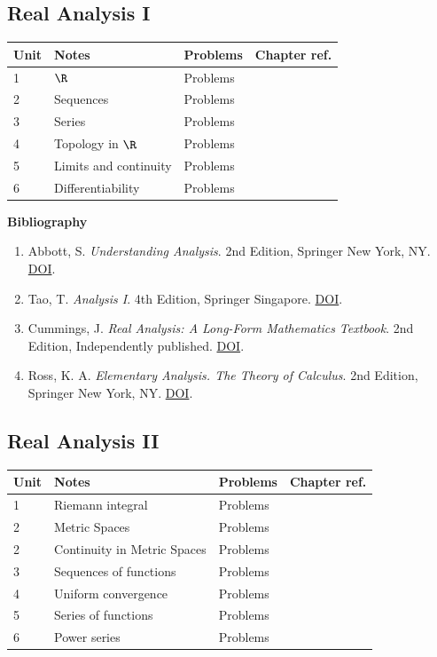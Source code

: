 \subsection*{Real Analysis I}

\begin{tabular}{llll}
  \hline
  Unit & Notes & Problems & Chapter ref. \\
  \hline
  1 & $\R$ & Problems & \\
  2 & Sequences & Problems & \\
  3 & Series & Problems & \\
  4 & Topology in $\R$ & Problems & \\
  5 & Limits and continuity & Problems & \\
  6 & Differentiability & Problems & \\
  \hline
\end{tabular}

\textbf{Bibliography}

\begin{enumerate}
  \item Abbott, S. \emph{Understanding Analysis}. 2nd Edition, Springer New York, NY. \href{https://doi.org/10.1007/978-1-4939-2712-8}{DOI}.
  \item Tao, T. \emph{Analysis I}. 4th Edition, Springer Singapore. \href{https://doi.org/10.1007/978-981-19-7261-4}{DOI}.
  \item Cummings, J. \emph{Real Analysis: A Long-Form Mathematics Textbook}. 2nd Edition, Independently published. \href{https://longformmath.com/real-analysis-book}{DOI}.
  \item Ross, K. A. \emph{Elementary Analysis. The Theory of Calculus}. 2nd Edition, Springer New York, NY. \href{https://doi.org/10.1007/978-1-4614-6271-2}{DOI}.
\end{enumerate}

\subsection*{Real Analysis II}

\begin{tabular}{llll}
  \hline
  Unit & Notes & Problems & Chapter ref. \\
  \hline
  1 & Riemann integral & Problems & \\
  2 & Metric Spaces & Problems & \\
  2 & Continuity in Metric Spaces & Problems & \\
  3 & Sequences of functions & Problems & \\
  4 & Uniform convergence & Problems & \\
  5 & Series of functions & Problems & \\
  6 & Power series & Problems & \\
  \hline
\end{tabular}

